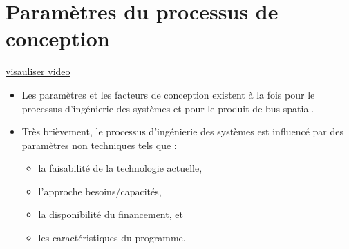 \section{Paramètres du processus de conception}
\href{https://youtu.be/6p1QOJi00qQ}{visauliser video}
\begin{itemize}
    \item Les paramètres et les facteurs de conception existent à la fois pour le processus d'ingénierie des systèmes et pour le produit de bus spatial.
    \item Très brièvement, le processus d'ingénierie des systèmes est influencé par des paramètres non techniques tels que :
    \begin{itemize}
        \item la faisabilité de la technologie actuelle,  
        \item l'approche besoins/capacités,  
        \item la disponibilité du financement, et  
        \item les caractéristiques du programme.  
    \end{itemize}
\end{itemize}
